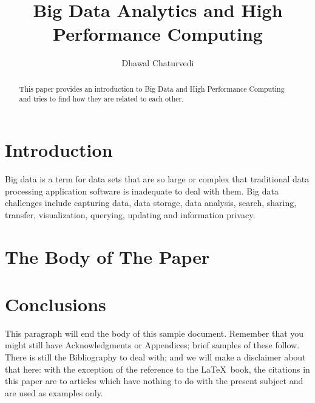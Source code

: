 \documentclass[sigconf]{acmart}
\begin{document}
\title{Big Data Analytics and High Performance Computing}

\author{Dhawal Chaturvedi}


\renewcommand{\shortauthors}{D.Chaturvedi}


\begin{abstract}
This paper provides an introduction to Big Data and High Performance Computing and tries to find how they are related to each other.
\end{abstract}



\maketitle

\section{Introduction}
Big data is a term for data sets that are so large or complex that traditional data processing application software is inadequate to deal with them. Big data challenges include capturing data, data storage, data analysis, search, sharing, transfer, visualization, querying, updating and information privacy.

\section{The Body of The Paper}


\section{Conclusions}

This paragraph will end the body of this sample document.  Remember
that you might still have Acknowledgments or Appendices; brief samples
of these follow.  There is still the Bibliography to deal with; and we
will make a disclaimer about that here: with the exception of the
reference to the \LaTeX\ book, the citations in this paper are to
articles which have nothing to do with the present subject and are
used as examples only.



\appendix
\end{document}

